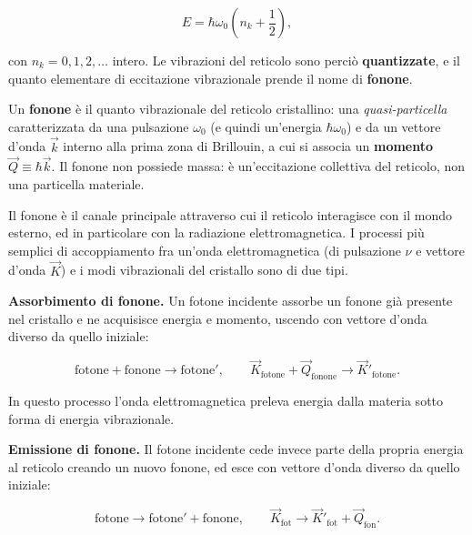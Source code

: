 \begin{importantbox}
    \begin{equation}
        E = \hbar \omega_0 \left( n_k + \frac{1}{2} \right),
    \end{equation}
\end{importantbox}

con \( n_k = 0, 1, 2, \dots \) intero. Le vibrazioni del reticolo sono perciò \textbf{quantizzate}, e il quanto elementare di eccitazione vibrazionale prende il nome di \textbf{fonone}.

\begin{definition}
Un \textbf{fonone} è il quanto vibrazionale del reticolo cristallino: una \emph{quasi-particella} caratterizzata da una pulsazione \( \omega_0 \) (e quindi un'energia \( \hbar \omega_0 \)) e da un vettore d'onda \( \vec{k} \) interno alla prima zona di Brillouin, a cui si associa un \textbf{momento} \( \vec{Q} \equiv \hbar \vec{k} \). Il fonone non possiede massa: è un'eccitazione collettiva del reticolo, non una particella materiale.
\end{definition}

Il fonone è il canale principale attraverso cui il reticolo interagisce con il mondo esterno, ed in particolare con la radiazione elettromagnetica. I processi più semplici di accoppiamento fra un'onda elettromagnetica (di pulsazione \( \nu \) e vettore d'onda \( \vec{K} \)) e i modi vibrazionali del cristallo sono di due tipi.

\textbf{Assorbimento di fonone.} Un fotone incidente assorbe un fonone già presente nel cristallo e ne acquisisce energia e momento, uscendo con vettore d'onda diverso da quello iniziale:

\begin{equation}
    \text{fotone} + \text{fonone} \longrightarrow \text{fotone}', \qquad \vec{K}_{\text{fotone}} + \vec{Q}_{\text{fonone}} \longrightarrow \vec{K}'_{\text{fotone}}.
\end{equation}

In questo processo l'onda elettromagnetica preleva energia dalla materia sotto forma di energia vibrazionale.

\textbf{Emissione di fonone.} Il fotone incidente cede invece parte della propria energia al reticolo creando un nuovo fonone, ed esce con vettore d'onda diverso da quello iniziale:

\begin{equation}
    \text{fotone} \longrightarrow \text{fotone}' + \text{fonone}, \qquad \vec{K}_{\text{fot}} \longrightarrow \vec{K}'_{\text{fot}} + \vec{Q}_{\text{fon}}.
\end{equation}

